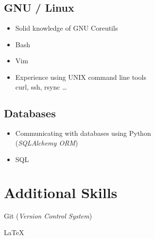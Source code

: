 \documentclass[a4paper, 13pt, draft]{article}
\begin{document}
\begin{multicols}{2}
    \subsection*{GNU / Linux}
    \begin{itemize}
	\setlength\itemsep{0em}
    \item Solid knowledge of GNU Coreutils
    \item Bash
    \item Vim
    \item Experience using UNIX command line tools \\
	curl, ssh, rsync \dots
\end{itemize}

\subsection*{Databases}

\begin{itemize}
    \setlength\itemsep{0em}
\item Communicating with databases using Python \\ (\textit{SQLAlchemy ORM})
\item SQL \\
\end{itemize}

\end{multicols}

\section*{\color{col1} Additional Skills \color{default}}

\begin{itemize}
    \begin{multicols}{2}
    \item Git (\textit{Version Control System})
    \item \LaTeX
    \end{multicols}
\end{itemize}
\end{document}
